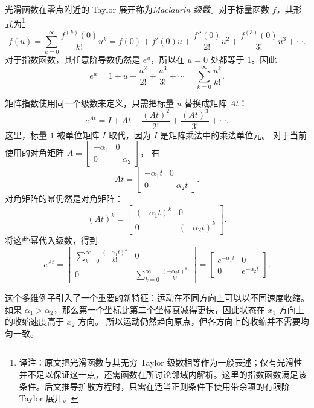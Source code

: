 \begin{tcolorbox}[
  colback=blue!4,
  colframe=blue!50!black,
  title={通过 Maclaurin 级数理解矩阵指数},
  boxrule=0.6pt,
  arc=2mm,
  left=2mm,
  right=2mm,
  top=1mm,
  bottom=1mm
]
光滑函数在零点附近的 Taylor 展开称为\emph{Maclaurin 级数}。对于标量函数 $f$，其形式为\footnote{译注：原文把光滑函数与其无穷 Taylor 级数相等作为一般表述；仅有光滑性并不足以保证这一点，还需函数在所讨论邻域内解析。这里的指数函数满足该条件。后文推导扩散方程时，只需在适当正则条件下使用带余项的有限阶 Taylor 展开。}
\[
f(u)
=
\sum_{k=0}^{\infty}\frac{f^{(k)}(0)}{k!}u^k
=
f(0)
+
f'(0)u
+
\frac{f''(0)}{2!}u^2
+
\frac{f^{(3)}(0)}{3!}u^3
+\cdots.
\]
对于指数函数，其任意阶导数仍然是 $e^u$，所以在 $u=0$ 处都等于 $1$。因此
\[
e^u
=
1+u+\frac{u^2}{2!}+\frac{u^3}{3!}+\cdots
=
\sum_{k=0}^{\infty}\frac{u^k}{k!}.
\]

矩阵指数使用同一个级数来定义，只需把标量 $u$ 替换成矩阵 $At$：
\[
\boxed{
e^{At}
=
I
+
At
+
\frac{(At)^2}{2!}
+
\frac{(At)^3}{3!}
+\cdots.
}
\]
这里，标量 $1$ 被单位矩阵 $I$ 取代，因为 $I$ 是矩阵乘法中的乘法单位元。
对于当前使用的对角矩阵
$A=
\begin{bmatrix}
-\alpha_1 & 0\\
0 & -\alpha_2
\end{bmatrix}$，
有
\[
At=
\begin{bmatrix}
-\alpha_1 t & 0\\
0 & -\alpha_2 t
\end{bmatrix}.
\]
对角矩阵的幂仍然是对角矩阵：
\[
(At)^k
=
\begin{bmatrix}
(-\alpha_1 t)^k & 0\\
0 & (-\alpha_2 t)^k
\end{bmatrix}.
\]
将这些幂代入级数，得到
\[
e^{At}
=
\begin{bmatrix}
\sum_{k=0}^{\infty}\frac{(-\alpha_1 t)^k}{k!} & 0\\
0 & \sum_{k=0}^{\infty}\frac{(-\alpha_2 t)^k}{k!}
\end{bmatrix}
=
\begin{bmatrix}
e^{-\alpha_1 t} & 0\\
0 & e^{-\alpha_2 t}
\end{bmatrix}.
\]
\end{tcolorbox}

这个多维例子引入了一个重要的新特征：运动在不同方向上可以以不同速度收缩。
如果 $\alpha_1>\alpha_2$，那么第一个坐标比第二个坐标衰减得更快，因此状态在 $x_1$ 方向上的收缩速度高于 $x_2$ 方向。
所以运动仍然趋向原点，但各方向上的收缩并不需要均匀一致。

